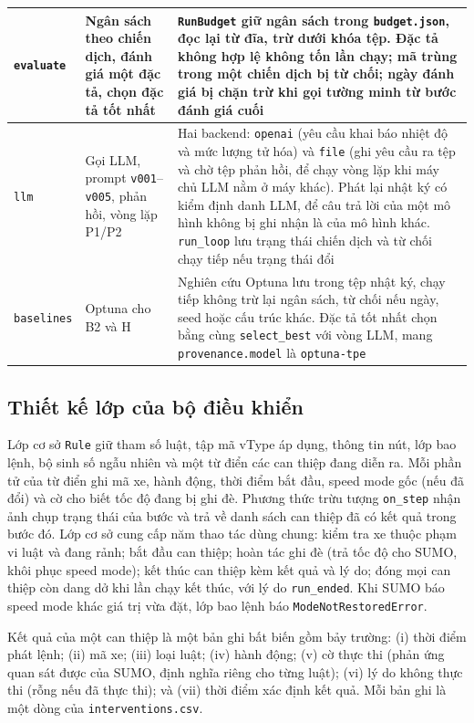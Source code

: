 \documentclass[../main.tex]{subfiles}
\begin{document}
\begin{longtable}{|p{2.3cm}|p{4.2cm}|p{7.5cm}|}
\texttt{evaluate} & Ngân sách theo chiến dịch, đánh giá một đặc tả, chọn đặc tả tốt nhất & \texttt{RunBudget} giữ ngân sách trong \texttt{budget.json}, đọc lại từ đĩa, trừ dưới khóa tệp. Đặc tả không hợp lệ không tốn lần chạy; mã trùng trong một chiến dịch bị từ chối; ngày đánh giá bị chặn trừ khi gọi tường minh từ bước đánh giá cuối \\ \hline
\texttt{llm} & Gọi LLM, prompt \texttt{v001}--\texttt{v005}, phản hồi, vòng lặp P1/P2 & Hai backend: \texttt{openai} (yêu cầu khai báo nhiệt độ và mức lượng tử hóa) và \texttt{file} (ghi yêu cầu ra tệp và chờ tệp phản hồi, để chạy vòng lặp khi máy chủ LLM nằm ở máy khác). Phát lại nhật ký có kiểm định danh LLM, để câu trả lời của một mô hình không bị ghi nhận là của mô hình khác. \texttt{run\_loop} lưu trạng thái chiến dịch và từ chối chạy tiếp nếu trạng thái đổi \\ \hline
\texttt{baselines} & Optuna cho B2 và H & Nghiên cứu Optuna lưu trong tệp nhật ký, chạy tiếp không trừ lại ngân sách, từ chối nếu ngày, seed hoặc cấu trúc khác. Đặc tả tốt nhất chọn bằng cùng \texttt{select\_best} với vòng LLM, mang \texttt{provenance.model} là \texttt{optuna-tpe} \\ \hline
\end{longtable}
\endgroup

\subsection{Thiết kế lớp của bộ điều khiển}

Lớp cơ sở \texttt{Rule} giữ tham số luật, tập mã vType áp dụng, thông tin nút, lớp bao lệnh, bộ sinh số ngẫu nhiên và một từ điển các can thiệp đang diễn ra. Mỗi phần tử của từ điển ghi mã xe, hành động, thời điểm bắt đầu, speed mode gốc (nếu đã đổi) và cờ cho biết tốc độ đang bị ghi đè. Phương thức trừu tượng \texttt{on\_step} nhận ảnh chụp trạng thái của bước và trả về danh sách can thiệp đã có kết quả trong bước đó. Lớp cơ sở cung cấp năm thao tác dùng chung: kiểm tra xe thuộc phạm vi luật và đang rảnh; bắt đầu can thiệp; hoàn tác ghi đè (trả tốc độ cho SUMO, khôi phục speed mode); kết thúc can thiệp kèm kết quả và lý do; đóng mọi can thiệp còn dang dở khi lần chạy kết thúc, với lý do \texttt{run\_ended}. Khi SUMO báo speed mode khác giá trị vừa đặt, lớp bao lệnh báo \texttt{ModeNotRestoredError}.

Kết quả của một can thiệp là một bản ghi bất biến gồm bảy trường: (i) thời điểm phát lệnh; (ii) mã xe; (iii) loại luật; (iv) hành động; (v) cờ thực thi (phản ứng quan sát được của SUMO, định nghĩa riêng cho từng luật); (vi) lý do không thực thi (rỗng nếu đã thực thi); và (vii) thời điểm xác định kết quả.
Mỗi bản ghi là một dòng của \texttt{interventions.csv}.
\end{document}
